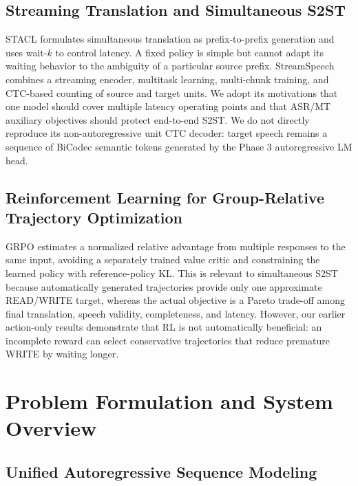 \documentclass[11pt,a4paper]{article}
\begin{document}
\subsection{Streaming Translation and Simultaneous S2ST}

STACL formulates simultaneous translation as prefix-to-prefix generation and uses wait-$k$ to control latency\cite{ma2019stacl}. A fixed policy is simple but cannot adapt its waiting behavior to the ambiguity of a particular source prefix. StreamSpeech combines a streaming encoder, multitask learning, multi-chunk training, and CTC-based counting of source and target units\cite{zhang2024streamspeech}. We adopt its motivations that one model should cover multiple latency operating points and that ASR/MT auxiliary objectives should protect end-to-end S2ST. We do not directly reproduce its non-autoregressive unit CTC decoder: target speech remains a sequence of BiCodec semantic tokens generated by the Phase 3 autoregressive LM head.

\subsection{Reinforcement Learning for Group-Relative Trajectory Optimization}

GRPO estimates a normalized relative advantage from multiple responses to the same input, avoiding a separately trained value critic and constraining the learned policy with reference-policy KL\cite{shao2024deepseekmath}. This is relevant to simultaneous S2ST because automatically generated trajectories provide only one approximate READ/WRITE target, whereas the actual objective is a Pareto trade-off among final translation, speech validity, completeness, and latency. However, our earlier action-only results demonstrate that RL is not automatically beneficial: an incomplete reward can select conservative trajectories that reduce premature WRITE by waiting longer.

\section{Problem Formulation and System Overview}

\subsection{Unified Autoregressive Sequence Modeling}
\end{document}
